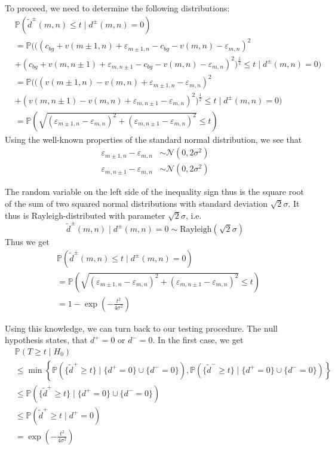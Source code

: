 \documentclass[a4paper,12pt]{article}
\theoremstyle{plain}
\theoremstyle{definition}
\theoremstyle{remark}
\begin{document}
To proceed, we need to determine the following distributions:
\begin{align*}
	&\mathbb{P}(\tilde{d}^\pm(m, n) \leq t \mid d^\pm(m, n) = 0) \\
	&= \mathbb{P}(( (c_{bg} + v(m \pm 1, n) + \varepsilon_{m \pm 1, n} - c_{bg} - v(m, n) - \varepsilon_{m, n})^2 \\
	&+ (c_{bg} + v(m, n \pm 1) + \varepsilon_{m, n \pm 1} - c_{bg} - v(m, n) - \varepsilon_{m, n})^2 )^{\frac{1}{2}} \leq t \mid d^\pm(m, n) = 0) \\
	&= \mathbb{P}(( (v(m \pm 1, n) - v(m, n) + \varepsilon_{m \pm 1, n} - \varepsilon_{m, n})^2 \\
	&+ (v(m, n \pm 1) - v(m, n) + \varepsilon_{m, n \pm 1} - \varepsilon_{m, n})^2 )^{\frac{1}{2}} \leq t \mid d^\pm(m, n) = 0) \\
	&= \mathbb{P} \left( \sqrt{ \left( \varepsilon_{m \pm 1, n} - \varepsilon_{m, n} \right)^2 + \left( \varepsilon_{m, n \pm 1} - \varepsilon_{m, n} \right)^2} \leq t \right)
\end{align*}
Using the well-known properties of the standard normal distribution, we see that
\begin{align*}
	\varepsilon_{m \pm 1, n} - \varepsilon_{m, n} &\sim \mathcal{N}(0, 2 \sigma^2) \\
	\varepsilon_{m, n \pm 1} - \varepsilon_{m, n} &\sim \mathcal{N}(0, 2 \sigma^2)
\end{align*}

The random variable on the left side of the inequality sign thus is the square root of the sum of two squared normal distributions with standard deviation $\sqrt{2} \sigma$. It thus is Rayleigh-distributed with parameter $\sqrt{2} \sigma$, i.e.
\begin{equation}\label{dist}
	\tilde{d}^\pm(m, n) \mid d^\pm(m, n) = 0 \sim \text{Rayleigh}(\sqrt{2} \sigma)
\end{equation}
Thus we get
\begin{align*}
	&\mathbb{P}(\tilde{d}^\pm(m, n) \leq t \mid d^\pm(m, n) = 0) \\
	&= \mathbb{P} \left( \sqrt{ \left( \varepsilon_{m \pm 1, n} - \varepsilon_{m, n} \right)^2 + \left( \varepsilon_{m, n \pm 1} - \varepsilon_{m, n} \right)^2} \leq t \right) \\
	&= 1 - \exp \left( - \frac{t^2}{4 \sigma^2} \right)
\end{align*}

Using this knowledge, we can turn back to our testing procedure. The null hypothesis states, that $d^+ = 0$ or $d^- = 0$. In the first case, we get
\begin{align*}
	&\mathbb{P}(T \geq t \mid H_0) \\
	&\leq \min \left\{ \mathbb{P}(\{ \tilde{d}^+ \geq t \} \mid \{ d^+ = 0 \} \cup \{ d^- = 0 \}), \mathbb{P}(\{ \tilde{d}^- \geq t \} \mid \{ d^+ = 0 \} \cup \{ d^- = 0 \}) \right\} \\
	&\leq \mathbb{P}(\{ \tilde{d}^+ \geq t \} \mid \{ d^+ = 0 \} \cup \{ d^- = 0 \}) \\
	&\leq \mathbb{P}(\tilde{d}^+ \geq t \mid d^+ = 0) \\
	&= \exp \left( - \frac{t^2}{4 \sigma^2} \right)
\end{align*}
\end{document}
